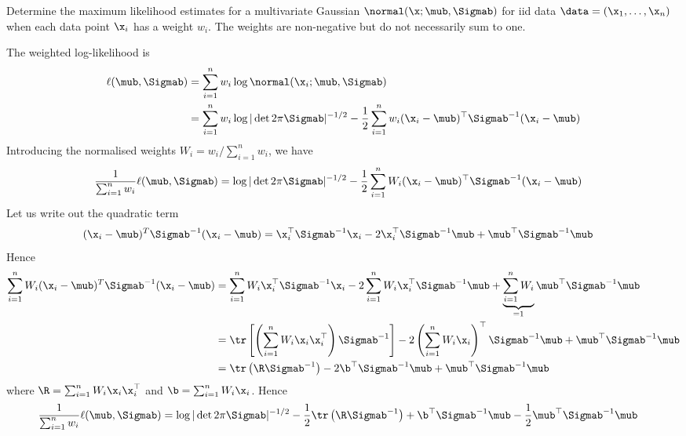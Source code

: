 \begin{exenumerate}

\item Determine the maximum likelihood estimates for a multivariate Gaussian
  $\normal(\x; \mub, \Sigmab)$ for iid data $\data = (\x_1, \ldots, \x_n)$ when
  each data point $\x_i$ has a weight $w_i$. The weights are non-negative but do
  not necessarily sum to one.

  \begin{solution}
 The weighted log-likelihood is
    \begin{align}
      \ell(\mub, \Sigmab) & = \sum_{i=1}^n w_i \log \normal(\x_i; \mub, \Sigmab)\\
                          & =  \sum_{i=1}^n w_i \log |\det 2 \pi \Sigmab|^{-1/2} - \frac{1}{2} \sum_{i=1}^n w_i (\x_i-\mub)^\top\Sigmab^{-1}(\x_i-\mub)
    \end{align}
    Introducing the normalised weights $W_i = w_i/ \sum_{i=1}^n w_i$, we have
    \begin{align}
      \frac{1}{ \sum_{i=1}^n w_i} \ell(\mub, \Sigmab)  &=  \log |\det 2 \pi \Sigmab|^{-1/2} - \frac{1}{2} \sum_{i=1}^n W_i (\x_i-\mub)^\top\Sigmab^{-1}(\x_i-\mub)
    \end{align}
    Let us write out the quadratic term
    \begin{align} 
            (\x_i-\mub)^T\Sigmab^{-1}(\x_i-\mub) &= \x_i^\top\Sigmab^{-1}\x_i- 2\x_i^\top \Sigmab^{-1} \mub + \mub^\top \Sigmab^{-1} \mub
    \end{align}
    Hence
    \begin{align}
      \sum_{i=1}^n W_i (\x_i-\mub)^T\Sigmab^{-1}(\x_i-\mub) &= \sum_{i=1}^n W_i \x_i^\top\Sigmab^{-1}\x_i -  2 \sum_{i=1}^n W_i\x_i^\top \Sigmab^{-1} \mub +
                                                             \underbrace{\sum_{i=1}^n W_i}_{=1}    \mub^\top \Sigmab^{-1} \mub  \\
                                                            &= \tr\left[ \left( \sum_{i=1}^n W_i \x_i \x_i^\top \right) \Sigmab^{-1} \right]- 2 \left( \sum_{i=1}^n W_i\x_i  \right)^\top \Sigmab^{-1} \mub +  \mub^\top \Sigmab^{-1} \mub \\
            &= \tr \left( \R \Sigmab^{-1}\right) -2 \b^\top \Sigmab^{-1}\mub +  \mub^\top\Sigmab^{-1} \mub
    \end{align}
    where $\R = \sum_{i=1}^n W_i \x_i \x_i^\top $ and $\b =  \sum_{i=1}^n
    W_i\x_i$. Hence
     \begin{align}
             \frac{1}{ \sum_{i=1}^n w_i} \ell(\mub, \Sigmab)  &=  \log |\det 2 \pi \Sigmab|^{-1/2} - \frac{1}{2} \tr \left( \R \Sigmab^{-1}\right) + \b^\top \Sigmab^{-1}\mub - \frac{1}{2}  \mub^\top\Sigmab^{-1} \mub

\end{align}
\end{solution}
\end{exenumerate}

